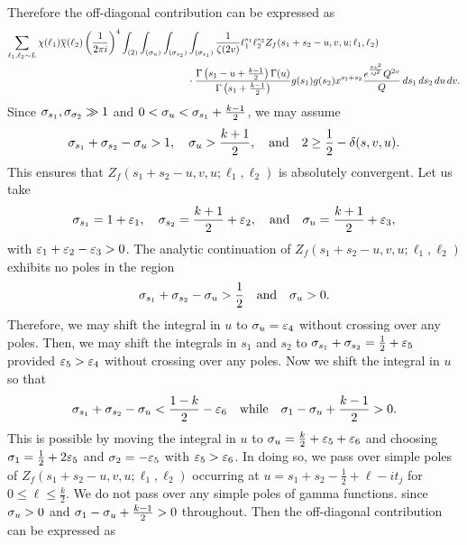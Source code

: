\documentclass[12pt,reqno,oneside]{amsart}
\begin{document}
    Therefore the off-diagonal contribution can be expressed as
    \begin{align*}
      \sum_{\ell_{1},\ell_{2} \sim L}\chi(\ell_{1})\overline{\chi}(\ell_{2})\left(\frac{1}{2\pi i}\right)^{4}\int_{(2)}\int_{(\sigma_{u})}\int_{(\sigma_{s_{2}})}&\int_{(\sigma_{s_{1}})}\frac{1}{\zeta(2v)}\ell_{1}^{s_{1}}\ell_{2}^{s_{2}}Z_{f}(s_{1}+s_{2}-u,v,u;\ell_{1},\ell_{2}) \\
      &\cdot \frac{\Gamma\left(s_{1}-u+\frac{k-1}{2}\right)\Gamma(u)}{\Gamma\left(s_{1}+\frac{k-1}{2}\right)}g(s_{1})g(s_{2})x^{s_{1}+s_{2}}\frac{e^{\frac{\pi v^{2}}{Q^{2}}}Q^{2v}}{Q}\,ds_{1}\,ds_{2}\,du\,dv.
    \end{align*}
    Since $\sigma_{s_{1}},\sigma_{\sigma_{2}} \gg 1$ and $0 < \sigma_{u} < \sigma_{s_{1}}+\frac{k-1}{2}$, we may assume
    \[
      \sigma_{s_{1}}+\sigma_{s_{2}}-\sigma_{u} > 1, \quad \sigma_{u} > \frac{k+1}{2}, \quad \text{and} \quad 2 \ge \frac{1}{2}-\delta(s,v,u).
    \]
    This ensures that $Z_{f}(s_{1}+s_{2}-u,v,u;\ell_{1},\ell_{2})$ is absolutely convergent. Let us take
    \[
      \sigma_{s_{1}} = 1+\varepsilon_{1}, \quad \sigma_{s_{2}} = \frac{k+1}{2}+\varepsilon_{2}, \quad \text{and} \quad \sigma_{u} = \frac{k+1}{2}+\varepsilon_{3},
    \]
    with $\varepsilon_{1}+\varepsilon_{2}-\varepsilon_{3} > 0$. The analytic continuation of $Z_{f}(s_{1}+s_{2}-u,v,u;\ell_{1},\ell_{2})$ exhibits no poles in the region
    \[
      \sigma_{s_{1}}+\sigma_{s_{2}}-\sigma_{u} > \frac{1}{2} \quad \text{and} \quad \sigma_{u} > 0.
    \]
    Therefore, we may shift the integral in $u$ to $\sigma_{u} = \varepsilon_{4}$ without crossing over any poles. Then, we may shift the integrals in $s_{1}$ and $s_{2}$ to $\sigma_{s_{1}}+\sigma_{s_{2}} = \frac{1}{2}+\varepsilon_{5}$ provided $\varepsilon_{5} > \varepsilon_{4}$ without crossing over any poles. Now we shift the integral in $u$ so that
    \[
      \sigma_{s_{1}}+\sigma_{s_{2}}-\sigma_{u} < \frac{1-k}{2}-\varepsilon_{6} \quad \text{while} \quad \sigma_{1}-\sigma_{u}+\frac{k-1}{2} > 0.
    \]
    This is possible by moving the integral in $u$ to $\sigma_{u} = \frac{k}{2}+\varepsilon_{5}+\varepsilon_{6}$ and choosing $\sigma_{1} = \frac{1}{2}+2\varepsilon_{5}$ and $\sigma_{2} = -\varepsilon_{5}$ with $\varepsilon_{5} > \varepsilon_{6}$. In doing so, we pass over simple poles of $Z_{f}(s_{1}+s_{2}-u,v,u;\ell_{1},\ell_{2})$ occurring at $u = s_{1}+s_{2}-\frac{1}{2}+\ell-it_{j}$ for $0 \le \ell \le \frac{k}{2}$. We do not pass over any simple poles of gamma functions. since $\sigma_{u} > 0$ and $\sigma_{1}-\sigma_{u}+\frac{k-1}{2} > 0$ throughout. Then the off-diagonal contribution can be expressed as
\end{document}
